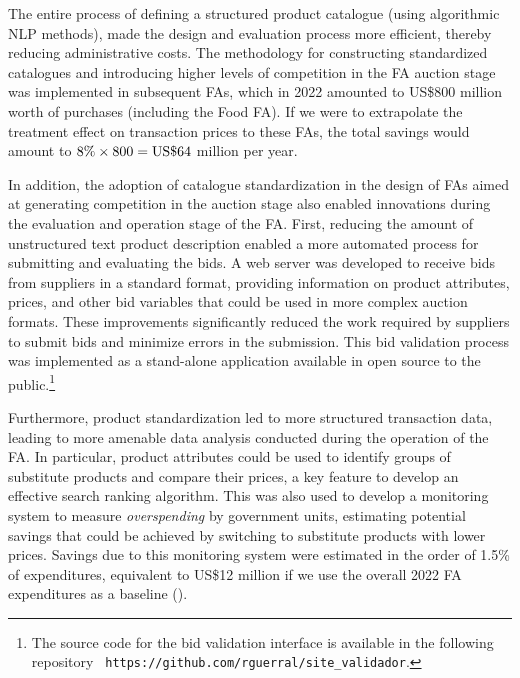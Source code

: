 {} The entire process of defining a structured product catalogue (using algorithmic NLP methods), made the design and evaluation process more efficient, thereby reducing administrative costs. The methodology for constructing standardized catalogues and introducing higher levels of competition in the FA auction stage was implemented in subsequent FAs, which in 2022 amounted to US\$800 million worth of purchases (including the Food FA).  If we were to extrapolate the treatment effect on transaction prices to these FAs, the total savings would amount to $8\% \times 800 = \textup{US}\$64$  million per year.%

In addition, the adoption of catalogue standardization in the design of FAs aimed at generating competition in the auction stage also enabled innovations during the evaluation and operation stage of the FA. 
First, reducing the amount of unstructured text product description enabled a more automated process for submitting and evaluating the bids. A web server was developed to receive bids from suppliers in a standard format, providing information on product attributes, prices, and other bid variables that could be used in more complex auction formats. These improvements significantly reduced the work required by suppliers to submit bids and minimize errors in the submission. This bid validation process was implemented as a stand-alone application available in open source to the public.\footnote{The source code for the bid validation interface is available in the following repository \texttt{ https://github.com/rguerral/site\_validador}. }

Furthermore, product standardization led to more structured transaction data, leading to more amenable data analysis conducted during the operation of the FA. In particular, product attributes could be used to identify groups of substitute products and compare their prices, {a key feature to develop an effective search ranking algorithm}. This was also used to develop a monitoring system to measure \textit{overspending} by government units, estimating potential savings that could be achieved by switching to substitute products with lower prices. Savings due to this monitoring system were estimated in the order of 1.5\% of expenditures, equivalent to  US\$12 million if we use the overall 2022 FA expenditures as a baseline (\cite{dipresFEI}).


